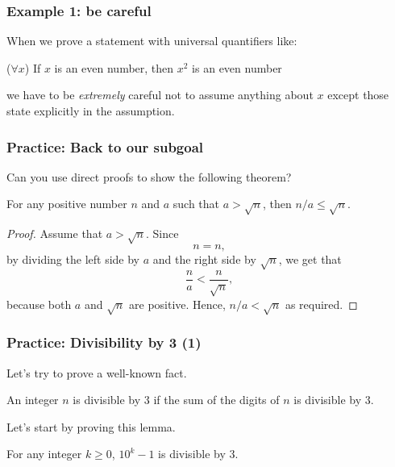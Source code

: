 \begin{frame}\frametitle{Example 1: be careful}
  When we prove a statement with universal quantifiers like:

  \begin{tcolorbox}
    ($\forall x$) If $x$ is an even number, then $x^2$ is an even
    number
  \end{tcolorbox}

  we have to be {\em extremely} careful not to assume anything about
  $x$ except those state explicitly in the assumption.
\end{frame}

\begin{frame}\frametitle{Practice: Back to our subgoal}
  Can you use direct proofs to show the following theorem?

  \begin{theorem}
    For any positive number $n$ and $a$ such that $a > \sqrt{n}$, then
    $n/a\leq\sqrt{n}$.
  \end{theorem} \pause

  \begin{proof}
    Assume that $a > \sqrt{n}$. \pause
    Since
    \[ n = n, \]
    by dividing the left side by $a$ and the right side by $\sqrt{n}$,
    we get that
    \[ \frac{n}{a} < \frac{n}{\sqrt{n}}, \]
    because both $a$ and $\sqrt{n}$ are positive.  Hence, $n/a <
    \sqrt{n}$ as required.
  \end{proof}
\end{frame}

\begin{frame}\frametitle{Practice: Divisibility by 3 (1)}
  Let's try to prove a well-known fact.

  \begin{theorem}
    An integer $n$ is divisible by $3$ if the sum of the digits of $n$
    is divisible by $3$.
  \end{theorem}
  \pause

  \vspace{0.2in}
  Let's start by proving this lemma.

  \begin{lemma}
    For any integer $k\geq 0$, $10^k - 1$ is divisible by $3$.
  \end{lemma}
\end{frame}

